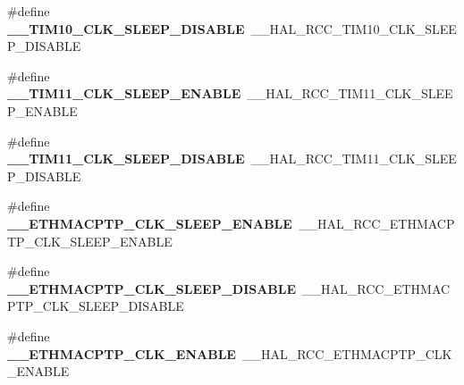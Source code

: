 \begin{DoxyCompactItemize}
\item 
\#define {\bfseries \+\_\+\+\_\+\+T\+I\+M10\+\_\+\+C\+L\+K\+\_\+\+S\+L\+E\+E\+P\+\_\+\+D\+I\+S\+A\+B\+LE}~\+\_\+\+\_\+\+H\+A\+L\+\_\+\+R\+C\+C\+\_\+\+T\+I\+M10\+\_\+\+C\+L\+K\+\_\+\+S\+L\+E\+E\+P\+\_\+\+D\+I\+S\+A\+B\+LE\hypertarget{group___h_a_l___r_c_c___aliased_ga66de9f2e0f7f60d24c3b44f15c8523c6}{}\label{group___h_a_l___r_c_c___aliased_ga66de9f2e0f7f60d24c3b44f15c8523c6}

\item 
\#define {\bfseries \+\_\+\+\_\+\+T\+I\+M11\+\_\+\+C\+L\+K\+\_\+\+S\+L\+E\+E\+P\+\_\+\+E\+N\+A\+B\+LE}~\+\_\+\+\_\+\+H\+A\+L\+\_\+\+R\+C\+C\+\_\+\+T\+I\+M11\+\_\+\+C\+L\+K\+\_\+\+S\+L\+E\+E\+P\+\_\+\+E\+N\+A\+B\+LE\hypertarget{group___h_a_l___r_c_c___aliased_ga4393063c2f3b735337d6732e01ee8978}{}\label{group___h_a_l___r_c_c___aliased_ga4393063c2f3b735337d6732e01ee8978}

\item 
\#define {\bfseries \+\_\+\+\_\+\+T\+I\+M11\+\_\+\+C\+L\+K\+\_\+\+S\+L\+E\+E\+P\+\_\+\+D\+I\+S\+A\+B\+LE}~\+\_\+\+\_\+\+H\+A\+L\+\_\+\+R\+C\+C\+\_\+\+T\+I\+M11\+\_\+\+C\+L\+K\+\_\+\+S\+L\+E\+E\+P\+\_\+\+D\+I\+S\+A\+B\+LE\hypertarget{group___h_a_l___r_c_c___aliased_ga690afa8116fd35919a36e091a8cf5c23}{}\label{group___h_a_l___r_c_c___aliased_ga690afa8116fd35919a36e091a8cf5c23}

\item 
\#define {\bfseries \+\_\+\+\_\+\+E\+T\+H\+M\+A\+C\+P\+T\+P\+\_\+\+C\+L\+K\+\_\+\+S\+L\+E\+E\+P\+\_\+\+E\+N\+A\+B\+LE}~\+\_\+\+\_\+\+H\+A\+L\+\_\+\+R\+C\+C\+\_\+\+E\+T\+H\+M\+A\+C\+P\+T\+P\+\_\+\+C\+L\+K\+\_\+\+S\+L\+E\+E\+P\+\_\+\+E\+N\+A\+B\+LE\hypertarget{group___h_a_l___r_c_c___aliased_ga87c7d1613c6a412c2bf635b73135b6ee}{}\label{group___h_a_l___r_c_c___aliased_ga87c7d1613c6a412c2bf635b73135b6ee}

\item 
\#define {\bfseries \+\_\+\+\_\+\+E\+T\+H\+M\+A\+C\+P\+T\+P\+\_\+\+C\+L\+K\+\_\+\+S\+L\+E\+E\+P\+\_\+\+D\+I\+S\+A\+B\+LE}~\+\_\+\+\_\+\+H\+A\+L\+\_\+\+R\+C\+C\+\_\+\+E\+T\+H\+M\+A\+C\+P\+T\+P\+\_\+\+C\+L\+K\+\_\+\+S\+L\+E\+E\+P\+\_\+\+D\+I\+S\+A\+B\+LE\hypertarget{group___h_a_l___r_c_c___aliased_gaec8c28c7d3756083ad01edb3f5c89af1}{}\label{group___h_a_l___r_c_c___aliased_gaec8c28c7d3756083ad01edb3f5c89af1}

\item 
\#define {\bfseries \+\_\+\+\_\+\+E\+T\+H\+M\+A\+C\+P\+T\+P\+\_\+\+C\+L\+K\+\_\+\+E\+N\+A\+B\+LE}~\+\_\+\+\_\+\+H\+A\+L\+\_\+\+R\+C\+C\+\_\+\+E\+T\+H\+M\+A\+C\+P\+T\+P\+\_\+\+C\+L\+K\+\_\+\+E\+N\+A\+B\+LE\hypertarget{group___h_a_l___r_c_c___aliased_ga766456044c0297038af8f53d58575c6b}{}\label{group___h_a_l___r_c_c___aliased_ga766456044c0297038af8f53d58575c6b}


\end{DoxyCompactItemize}
